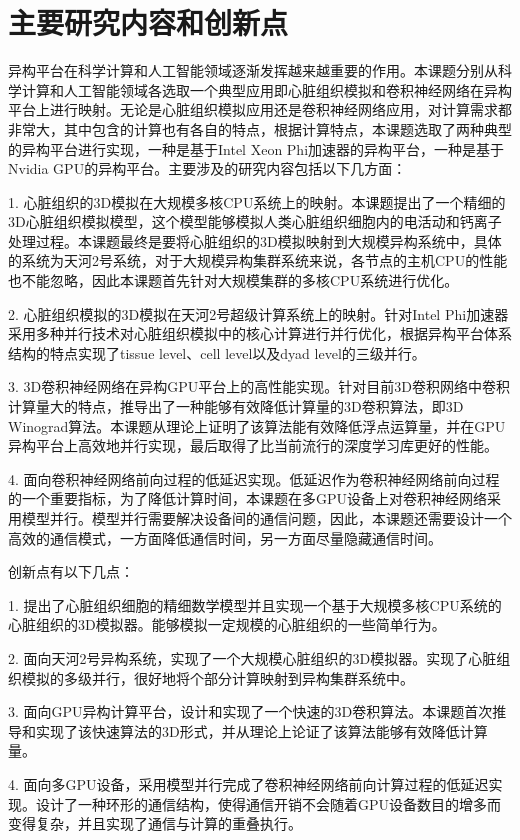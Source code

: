 \section{主要研究内容和创新点}
异构平台在科学计算和人工智能领域逐渐发挥越来越重要的作用。本课题分别从科学计算和人工智能领域各选取一个典型应用即心脏组织模拟和卷积神经网络在异构平台上进行映射。无论是心脏组织模拟应用还是卷积神经网络应用，对计算需求都非常大，其中包含的计算也有各自的特点，根据计算特点，本课题选取了两种典型的异构平台进行实现，一种是基于Intel Xeon Phi加速器的异构平台，一种是基于Nvidia GPU的异构平台。主要涉及的研究内容包括以下几方面：
\begin{compactitem}
\item[1.]心脏组织的3D模拟在大规模多核CPU系统上的映射。本课题提出了一个精细的3D心脏组织模拟模型，这个模型能够模拟人类心脏组织细胞内的电活动和钙离子处理过程。本课题最终是要将心脏组织的3D模拟映射到大规模异构系统中，具体的系统为天河2号系统，对于大规模异构集群系统来说，各节点的主机CPU的性能也不能忽略，因此本课题首先针对大规模集群的多核CPU系统进行优化。

\item[2.]心脏组织模拟的3D模拟在天河2号超级计算系统上的映射。针对Intel Phi加速器采用多种并行技术对心脏组织模拟中的核心计算进行并行优化，根据异构平台体系结构的特点实现了tissue level、cell level以及dyad level的三级并行。

\item[3.]3D卷积神经网络在异构GPU平台上的高性能实现。针对目前3D卷积网络中卷积计算量大的特点，推导出了一种能够有效降低计算量的3D卷积算法，即3D Winograd算法。本课题从理论上证明了该算法能有效降低浮点运算量，并在GPU异构平台上高效地并行实现，最后取得了比当前流行的深度学习库更好的性能。

\item[4.]面向卷积神经网络前向过程的低延迟实现。低延迟作为卷积神经网络前向过程的一个重要指标，为了降低计算时间，本课题在多GPU设备上对卷积神经网络采用模型并行。模型并行需要解决设备间的通信问题，因此，本课题还需要设计一个高效的通信模式，一方面降低通信时间，另一方面尽量隐藏通信时间。

\end{compactitem}

创新点有以下几点：
\begin{compactitem}
\item[1.]提出了心脏组织细胞的精细数学模型并且实现一个基于大规模多核CPU系统的心脏组织的3D模拟器。能够模拟一定规模的心脏组织的一些简单行为。

\item[2.]面向天河2号异构系统，实现了一个大规模心脏组织的3D模拟器。实现了心脏组织模拟的多级并行，很好地将个部分计算映射到异构集群系统中。

\item[3.]面向GPU异构计算平台，设计和实现了一个快速的3D卷积算法。本课题首次推导和实现了该快速算法的3D形式，并从理论上论证了该算法能够有效降低计算量。

\item[4.]面向多GPU设备，采用模型并行完成了卷积神经网络前向计算过程的低延迟实现。设计了一种环形的通信结构，使得通信开销不会随着GPU设备数目的增多而变得复杂，并且实现了通信与计算的重叠执行。

\end{compactitem}

